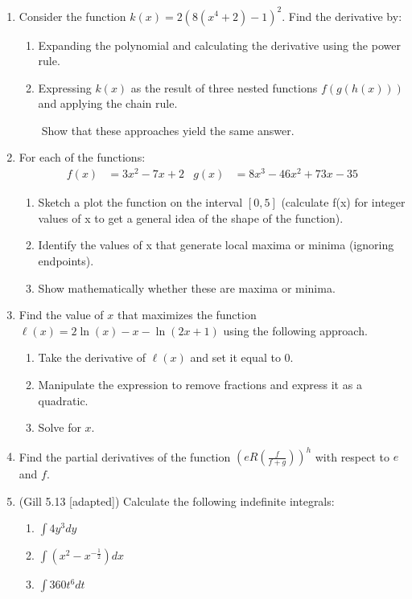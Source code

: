 \documentclass[11pt]{article}
\begin{document}
\begin{enumerate}
\item Consider the function $k(x) = 2(8(x^4 + 2) - 1)^2$.  Find the derivative by:
\begin{enumerate}
\item Expanding the polynomial and calculating the derivative using the power rule.
\item Expressing $k(x)$ as the result of three nested functions $f(g(h(x)))$ and applying the chain rule.
\end{enumerate}
~~~~Show that these approaches yield the same answer.




\item For each of the functions:
\begin{align*}
f(x) &= 3x^2 - 7x + 2 &  g(x) &= 8x^3 - 46x^2 + 73x - 35
\end{align*}
\begin{enumerate}
\item Sketch a plot the function on the interval $[0,5]$ (calculate f(x) for integer values of x to get a general idea of the shape of the function).
\item Identify the values of x that generate local maxima or minima (ignoring endpoints).
\item Show mathematically whether these are maxima or minima.
\end{enumerate}



\item Find the value of $x$ that maximizes the function $\ell(x) = 2\ln(x) - x - \ln(2x+1)$ using the following approach.
\begin{enumerate}
\item Take the derivative of $\ell(x)$ and set it equal to 0.
\item Manipulate the expression to remove fractions and express it as a quadratic.
\item Solve for $x$.
\end{enumerate}



\item Find the partial derivatives of the function $(eR(\frac{f}{f+g}))^h$ with respect to $e$ and $f$.




\item (Gill 5.13 [adapted]) Calculate the following indefinite integrals:
\begin{enumerate}
 \item $\int 4y^3 dy$ 
 \item $\int (x^2 - x^{-\frac{1}{2}}) dx$ 
 \item $\int 360t^6 dt$
\end{enumerate}




\end{enumerate}
\end{document}
